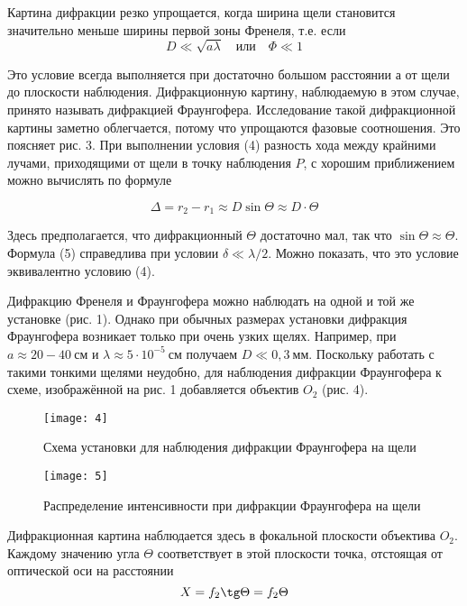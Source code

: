 \documentclass[a4paper, 12pt]{article}
\begin{document}
Картина дифракции резко упрощается, когда ширина щели становится
значительно меньше ширины первой зоны Френеля, т.е. если 
\begin{equation}
    D \ll \sqrt{a \lambda} \quad \text{или} \quad \Phi \ll 1
\end{equation}

Это условие всегда выполняется при достаточно большом расстоянии а от
щели до плоскости наблюдения. Дифракционную картину, наблюдаемую в
этом случае, принято называть дифракцией Фраунгофера. Исследование
такой дифракционной картины заметно облегчается, потому 
что упрощаются фазовые соотношения. Это поясняет рис. 3. При
выполнении условия (4) разность хода между крайними лучами,
приходящими от щели в точку наблюдения $P$, с хорошим приближением можно
вычислять по формуле

\begin{equation}
    \Delta = r_2-r_1 \approx D \sin \Theta \approx D \cdot \Theta
\end{equation}

Здесь предполагается, что дифракционный $\Theta$ достаточно мал, так
что $\sin \Theta \approx \Theta$. Формула (5) справедлива при условии
$\delta \ll \lambda/2$. Можно показать, что это условие эквивалентно
условию (4).

Дифракцию Френеля и Фраунгофера можно наблюдать на одной и той же
установке (рис. 1). Однако при обычных размерах установки дифракция
Фраунгофера возникает только при очень узких щелях. Например, при
$a \approx 20-40\ \text{см}$ и $\lambda \approx 5\cdot 10^{-5}\
\text{см}$ получаем $D \ll 0,3\ \text{мм}$. Поскольку работать с
такими тонкими щелями неудобно, для наблюдения дифракции Фраунгофера к
схеме, изображённой на рис. 1 добавляется объектив $O_2$ (рис. 4).

\begin{figure}[H]
    \texttt{[image: 4]} 
    \caption{Схема установки для наблюдения дифракции Фраунгофера на
    щели}
\end{figure}

\begin{wrapfigure}{r}{0.4\linewidth}
    \vspace{-10pt}
    \texttt{[image: 5]}
    \caption{Распределение интенсивности при дифракции Фраунгофера на
    щели}
\end{wrapfigure}

Дифракционная картина наблюдается здесь в фокальной плоскости
объектива $O_2$. Каждому значению угла $\Theta$ соответствует в этой
плоскости точка, отстоящая от оптической оси на расстоянии 
\begin{equation}
    X = f_2 \tg \Theta = f_2 \Theta
\end{equation}
\end{document}

